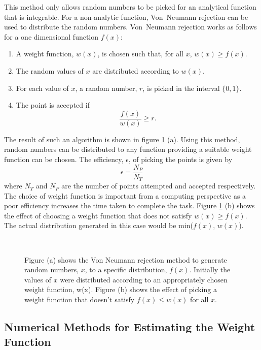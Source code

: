 This method only allows random numbers to be picked for an analytical function that is integrable. For a non-analytic function, Von~Neumann rejection can be used to distribute the random numbers. Von~Neumann rejection works as follows for a one dimensional function $f(x)$:
\begin{enumerate}
\item A weight function, $w(x)$, is chosen such that, for all $x$, $w(x) \geq f(x)$.
\item The random values of $x$ are distributed according to $w(x)$.
\item For each value of $x$, a random number, $r$, is picked in the interval $\{0, 1\}$.
\item The point is accepted if 
\begin{equation}
\frac{f(x)}{w(x)} \geq r .
\end{equation}
\end{enumerate}
The result of such an algorithm is shown in figure \ref{vonneu} (a). Using this method, random numbers can be distributed to any function providing a suitable weight function can be chosen. The efficiency, $\epsilon$, of picking the points is given by 
\begin{equation}
\epsilon = \frac{N_{P}}{N_{T}}
\end{equation}
where $N_{T}$ and $N_P$ are the number of points attempted and accepted respectively. The choice of weight function is important from a computing perspective as a poor efficiency increases the time taken to complete the task.
Figure \ref{vonneu} (b) shows the effect of choosing a weight function that does not satisfy $w(x) \geq f(x)$. The actual distribution generated in this case would be min($f(x)$, $w(x)$).
\begin{figure} 
\centering
\mbox{
}
\caption[The Von Neumann technique to generate random numbers  to a distribution]{Figure (a) shows the Von Neumann  rejection method to generate random numbers, $x$, to a specific distribution, $f(x)$. Initially the values of $x$ were distributed according to an appropriately chosen weight function, w(x). Figure (b) shows the effect of picking a weight function that doesn't satisfy $f(x) \leq w(x)$ for all $x$.\label{vonneu}}
\end{figure}


\subsection{Numerical Methods for Estimating the Weight Function}\label{mcnumerical}

